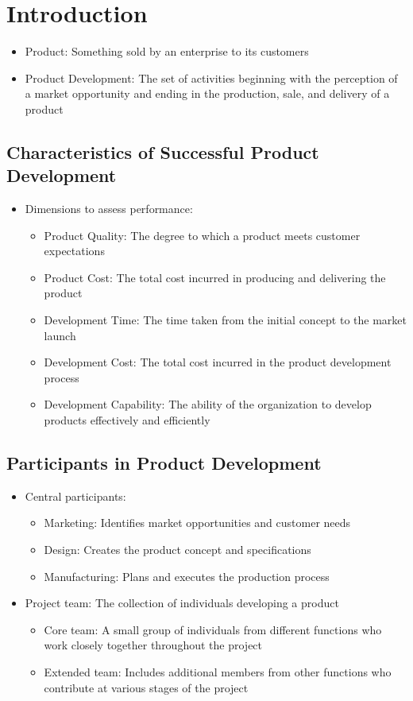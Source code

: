 \documentclass[a4paper,12pt,openany]{book}
\begin{document}
\chapter{Introduction}
\begin{itemize}
    \item Product: Something sold by an enterprise to its customers
    \item Product Development: The set of activities beginning with the perception of a market opportunity and ending in the production, sale, and delivery of a product
\end{itemize}
\section{Characteristics of Successful Product Development}
\begin{itemize}
    \item Dimensions to assess performance:
    \begin{itemize}
        \item Product Quality: The degree to which a product meets customer expectations
        \item Product Cost: The total cost incurred in producing and delivering the product
        \item Development Time: The time taken from the initial concept to the market launch
        \item Development Cost: The total cost incurred in the product development process
        \item Development Capability: The ability of the organization to develop products effectively and efficiently
    \end{itemize}
\end{itemize}

\section{Participants in Product Development}
\begin{itemize}
    \item Central participants:
    \begin{itemize}
        \item Marketing: Identifies market opportunities and customer needs
        \item Design: Creates the product concept and specifications
        \item Manufacturing: Plans and executes the production process
    \end{itemize}
    \item Project team: The collection of individuals developing a product
    \begin{itemize}
        \item Core team: A small group of individuals from different functions who work closely together throughout the project
        \item Extended team: Includes additional members from other functions who contribute at various stages of the project
    \end{itemize}
\end{itemize}
\end{document}
